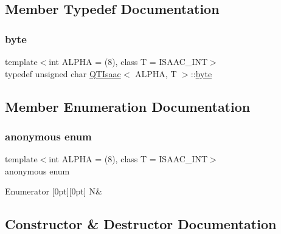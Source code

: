 \subsection{Member Typedef Documentation}
\mbox{\label{classQTIsaac_a1f78939d0806ed6006253a9ead8052b3}} 
\subsubsection{\texorpdfstring{byte}{byte}}
{\footnotesize\ttfamily template$<$int A\+L\+P\+HA = (8), class T = I\+S\+A\+A\+C\+\_\+\+I\+NT$>$ \\
typedef unsigned char \hyperlink{classQTIsaac}{Q\+T\+Isaac}$<$ A\+L\+P\+HA, T $>$\+::\hyperlink{classQTIsaac_a1f78939d0806ed6006253a9ead8052b3}{byte}}



\subsection{Member Enumeration Documentation}
\mbox{\label{classQTIsaac_a2f9d908d12a5725146e161998b733233}} 
\subsubsection{\texorpdfstring{anonymous enum}{anonymous enum}}
{\footnotesize\ttfamily template$<$int A\+L\+P\+HA = (8), class T = I\+S\+A\+A\+C\+\_\+\+I\+NT$>$ \\
anonymous enum}

\begin{DoxyEnumFields}{Enumerator}
[0pt][0pt]{}\mbox{\label{classQTIsaac_a2f9d908d12a5725146e161998b733233a44174520f740123b364728ca92b3dc97}} 
N&\\
\hline

\end{DoxyEnumFields}


\subsection{Constructor \& Destructor Documentation}
\mbox{\label{classQTIsaac_afbf292ab78e041bd2bbd5066241d88c3}} 
